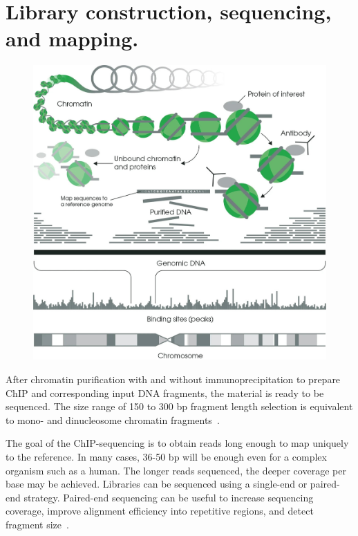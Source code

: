 











\section{Library construction, sequencing, and mapping.}

\begin{figure}[b!]
    \centering
    \includegraphics[width=\textwidth]{../img/chip.jpeg}
    \label{fig:graph_classes}
\end{figure}


After chromatin purification with and without immunoprecipitation to prepare ChIP and corresponding input DNA fragments, the material is ready to be sequenced. 
The size range of 150 to 300 bp fragment length selection is equivalent to mono- and dinucleosome chromatin fragments~\cite{kidder2011chip}.

The goal of the ChIP-sequencing is to obtain reads long enough to map uniquely to the reference.  
In many cases, 36-50 bp will be enough even for a complex organism such as a human. 
The longer reads sequenced, the deeper coverage per base may be achieved.
Libraries can be sequenced using a single-end or paired-end strategy. 
Paired-end sequencing can be useful to increase sequencing coverage, improve alignment efficiency into repetitive regions, and detect fragment size~\cite{kidder2011chip, chen2012systematic}.




